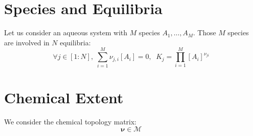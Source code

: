 \documentclass[aps,12pt]{revtex4}
\newcommand{\conc}[1]{{\left[#1\right]}}
\begin{document}
\section{Species and Equilibria}
Let us consider an aqueous system with $M$ species $A_1,\ldots,A_M$.
Those $M$ species are involved in $N$ equilibria:
\begin{equation}
	\forall j\in[1:N], \; \sum_{i=1}^M \nu_{j,i} \conc{A_i} = 0,
	 \;\; K_j = \prod_{i=1}^M \conc{A_i}^{\nu_{ji}}
\end{equation}

\section{Chemical Extent}
We consider the chemical topology matrix:
\begin{equation}
	\bm{\nu} \in \mathcal{M}
\end{equation}
\end{document}
